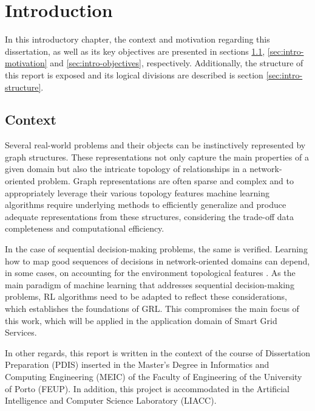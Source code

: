 
\chapter{Introduction} \label{chap:intro}

In this introductory chapter, the context and motivation regarding this dissertation, as well as its key objectives are presented in sections \ref{sec:intro-context}, \ref{sec:intro-motivation} and \ref{sec:intro-objectives}, respectively. Additionally, the structure of this report is exposed and its logical divisions are described is section \ref{sec:intro-structure}.

\section{Context} \label{sec:intro-context}

Several real-world problems and their objects can be instinctively represented by graph structures. These representations not only capture the main properties of a given domain but also the intricate topology of relationships in a network-oriented problem. Graph representations are often sparse and complex and to appropriately leverage their various topology features   machine learning algorithms require underlying methods to efficiently generalize and produce adequate representations from these structures, considering the trade-off data completeness and computational efficiency. \par
In the case of sequential decision-making problems, the same is verified. Learning how to map good sequences of decisions in network-oriented domains can depend, in some cases, on accounting for the environment topological features \cite{bifanAttentionBasedMultiAgentGraph2023bid}. As the main paradigm of machine learning that addresses sequential decision-making problems, \ac{RL} algorithms need to be adapted to reflect these considerations, which establishes the foundations of \acf{GRL}. This compromises the main focus of this work, which will be applied in the application domain of Smart Grid Services. \par
In other regards, this report is written in the context of the course of Dissertation Preparation (PDIS) inserted in the Master's Degree in Informatics and Computing Engineering (MEIC) of the Faculty of Engineering of the University of Porto (FEUP).  In addition, this project is accommodated in the Artificial Intelligence and Computer Science Laboratory (LIACC). \par



